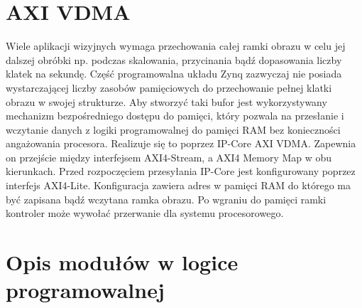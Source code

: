 \section{AXI VDMA}
Wiele aplikacji wizyjnych wymaga przechowania całej ramki obrazu w celu jej dalszej obróbki np. podczas skalowania, przycinania bądź dopasowania liczby klatek na sekundę. 
Część programowalna układu Zynq zazwyczaj nie posiada wystarczającej liczby zasobów pamięciowych do przechowanie pełnej klatki obrazu w swojej strukturze. 
Aby stworzyć taki bufor jest wykorzystywany mechanizm bezpośredniego dostępu do pamięci, który pozwala na przesłanie i wczytanie danych z logiki programowalnej do pamięci RAM bez konieczności angażowania procesora. 
Realizuje się to poprzez IP-Core AXI VDMA. 
Zapewnia on przejście między interfejsem AXI4-Stream, a AXI4 Memory Map w obu kierunkach. 
Przed rozpoczęciem przesyłania IP-Core jest konfigurowany poprzez interfejs AXI4-Lite. 
Konfiguracja zawiera adres w pamięci RAM do którego ma być zapisana bądź wczytana ramka obrazu. 
Po wgraniu do pamięci ramki kontroler może wywołać przerwanie dla systemu procesorowego.
\section{Opis modułów w logice programowalnej}
